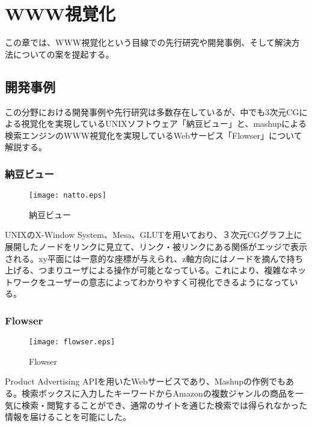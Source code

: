 \chapter{WWW視覚化}
\label{chap:visualize}

この章では、WWW視覚化という目線での先行研究や開発事例、そして解決方法についての案を提起する。

\section{開発事例}
この分野における開発事例や先行研究は多数存在しているが、中でも3次元CGによる視覚化を実現しているUNIXソフトウェア「納豆ビュー\cite{natto}」と、mashupによる検索エンジンのWWW視覚化を実現しているWebサービス「Flowser\cite{flowser}」について解説する。

\subsection{納豆ビュー}
\begin{figure}[htbp]
\begin{center}
\texttt{[image: natto.eps]}
\caption{納豆ビュー}
\label{納豆ビュー}
\end{center}
\end{figure}
UNIXのX-Window System、Mesa、GLUTを用いており、３次元CGグラフ上に展開したノードをリンクに見立て、リンク・被リンクにある関係がエッジで表示される。xy平面には一意的な座標が与えられ、z軸方向にはノードを摘んで持ち上げる、つまりユーザによる操作が可能となっている。これにより、複雑なネットワークをユーザーの意志によってわかりやすく可視化できるようになっている。

\subsection{Flowser}
\begin{figure}[htbp]
\begin{center}
\texttt{[image: flowser.eps]}
\caption{Flowser}
\label{flowser}
\end{center}
\end{figure}
Product Advertising APIを用いたWebサービスであり、Mashupの作例でもある。検索ボックスに入力したキーワードからAmazonの複数ジャンルの商品を一気に検索・閲覧することができ、通常のサイトを通じた検索では得られなかった情報を届けることを可能にした。


